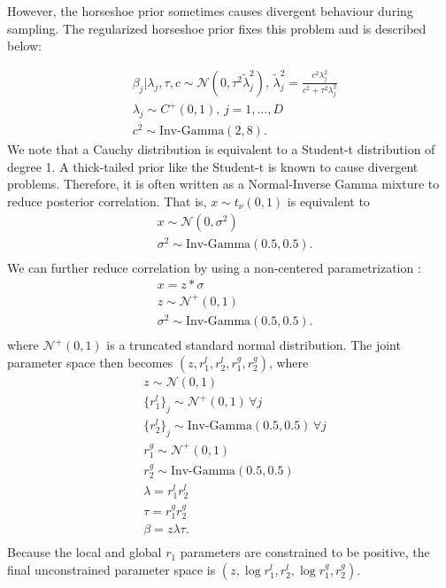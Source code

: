 \documentclass[12pt]{report}
\begin{document}
However, the horseshoe prior sometimes causes divergent behaviour during sampling. The regularized horseshoe prior \cite{piironen2017sparsity} fixes this problem and is described below:

\begin{align*}
&\beta_j | \lambda_j, \tau, c \sim \mathcal{N}(0,\tau^2 \tilde{\lambda}_j^2) ,\, \tilde{\lambda}_j^2 = \frac{c^2 \lambda_j^2}{c^2 + \tau^2 \lambda_j^2} \\
&\lambda_j \sim C^+(0,1),\, j = 1,\dots,D\\
&c^2 \sim \text{Inv-Gamma}(2,8) .
\end{align*}
We note that a Cauchy distribution is equivalent to a Student-t distribution of degree 1. A thick-tailed prior like the Student-t is known to cause divergent problems. Therefore, it is often written as a Normal-Inverse Gamma mixture to reduce posterior correlation. That is, $x \sim t_{\nu}(0,1) $ is 
equivalent to 
\begin{align*}
& x \sim \mathcal{N}(0,\sigma^2)\\
&\sigma^2 \sim \text{Inv-Gamma}(0.5,0.5). \\
\end{align*}
We can further reduce correlation by using a non-centered parametrization \cite{piironen2017sparsity}:
\begin{align*}
& x = z * \sigma \\
& z \sim \mathcal{N}^+(0,1)\\
&\sigma^2 \sim \text{Inv-Gamma}(0.5,0.5). \\
\end{align*}
where $\mathcal{N}^+(0,1)$ is a truncated standard normal distribution.
The joint parameter space then becomes $(z,r_1^l,r_2^l,r_1^g,r_2^g) $,
where
\begin{align*}
& z \sim \mathcal{N}(0,1) \\
& \{r_1^l\}_j \sim \mathcal{N}^+(0,1) \, \forall j \\
& \{r_2^l\}_j \sim \text{Inv-Gamma}(0.5,0.5) \, \forall j  \\
& r_1^g \sim \mathcal{N}^+(0,1)  \\
& r_2^g \sim \text{Inv-Gamma}(0.5,0.5)   \\
& \lambda =  r_1^l  r_2^l \\
& \tau = r_1^g  r_2^g \\
& \beta = z  \lambda \tau . \\
\end{align*}
Because the local and global $r_1$ parameters are constrained to be positive, the final unconstrained parameter space is $(z,\log r_1^l,r_2^l,\log r_1^g,r_2^g).$
\end{document}
